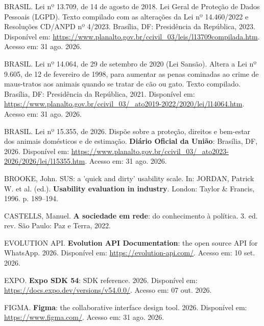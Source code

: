 \begin{flushleft}
\vspace{12pt}
\noindent BRASIL. Lei nº 13.709, de 14 de agosto de 2018. Lei Geral de Proteção de Dados Pessoais (LGPD). Texto compilado com as alterações da Lei nº 14.460/2022 e Resoluções CD/ANPD nº 4/2023. Brasília, DF: Presidência da República, 2023. Disponível em: \url{https://www.planalto.gov.br/ccivil_03/leis/l13709compilada.htm}. Acesso em: 31 ago. 2026.

\vspace{12pt}
\noindent BRASIL. Lei nº 14.064, de 29 de setembro de 2020 (Lei Sansão). Altera a Lei nº 9.605, de 12 de fevereiro de 1998, para aumentar as penas cominadas ao crime de maus-tratos aos animais quando se tratar de cão ou gato. Texto compilado. Brasília, DF: Presidência da República, 2021. Disponível em: \url{https://www.planalto.gov.br/ccivil_03/_ato2019-2022/2020/lei/l14064.htm}. Acesso em: 31 ago. 2026.

\vspace{12pt}
\noindent BRASIL. Lei nº 15.355, de 2026. Dispõe sobre a proteção, direitos e bem-estar dos animais domésticos e de estimação. \textbf{Diário Oficial da União}: Brasília, DF, 2026. Disponível em: \url{https://www.planalto.gov.br/ccivil_03/_ato2023-2026/2026/lei/l15355.htm}. Acesso em: 31 ago. 2026.

\vspace{12pt}
\noindent BROOKE, John. SUS: a 'quick and dirty' usability scale. In: JORDAN, Patrick W. et al. (ed.). \textbf{Usability evaluation in industry}. London: Taylor \& Francis, 1996. p. 189--194.

\vspace{12pt}
\noindent CASTELLS, Manuel. \textbf{A sociedade em rede}: do conhecimento à política. 3. ed. rev. São Paulo: Paz e Terra, 2022.

\vspace{12pt}
\vspace{12pt}
\noindent EVOLUTION API. \textbf{Evolution API Documentation}: the open source API for WhatsApp. 2026. Disponível em: \url{https://evolution-api.com/}. Acesso em: 10 set. 2026.

\vspace{12pt}
\noindent EXPO. \textbf{Expo SDK 54}: SDK reference. 2026. Disponível em: \url{https://docs.expo.dev/versions/v54.0.0/}. Acesso em: 07 out. 2026.

\vspace{12pt}
\noindent FIGMA. \textbf{Figma}: the collaborative interface design tool. 2026. Disponível em: \url{https://www.figma.com/}. Acesso em: 31 ago. 2026.


\end{flushleft}
